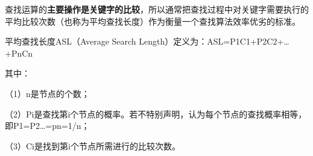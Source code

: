 查找运算的{\textbf{主要操作是关键字的比较}}，所以通常把查找过程中{对关键字需要执行的平均比较次数（也称为平均查找长度）作为衡量一个查找算法效率优劣的标准}。

平均查找长度ASL（Average Search
Length）定义为：ASL={P1C1+P2C2+\ldots{}+PnCn}

其中：

（1）n是节点的个数；

（2）Pi是查找第i个节点的概率。若不特别声明，认为每个节点的查找概率相等，即P1=P2\ldots{}=pn=1/n；

（3）Ci是找到第i个节点所需进行的比较次数。
